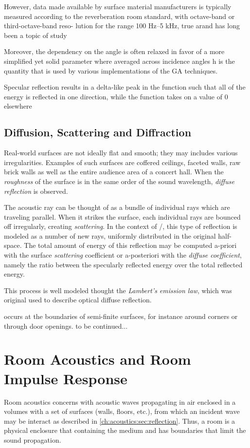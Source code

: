 However, data made available by surface material manufacturers is typically measured according to the reverberation room standard, with octave-band or third-octave-band reso- lution for the range 100 Hz–5 kHz,
true arand has long been a topic of study

Moreover, the dependency on the angle is often relaxed in favor of a more simplified yet solid parameter where
averaged across incidence angles h is the quantity that is used by various implementations of the GA techniques.

Specular reflection results in a delta-like peak in the function such that all of the energy is reflected in one direction, while the function takes on a value of 0 elsewhere

\subsection{Diffusion, Scattering and Diffraction}
Real-world surfaces are not ideally flat and smooth; they may includes various irregularities.
Examples of such surfaces are coffered ceilings, faceted walls, raw brick walls as well as the entire audience area of a concert hall.
When the \textit{roughness} of the surface is in the same order of the sound wavelength, \textit{diffuse reflection} is observed.

The acoustic ray can be thought of as a bundle of individual rays which are traveling parallel.
When it strikes the surface, each individual rays are bounced off irregularly, creating \textit{scattering}.
In the context of \GA/, this type of reflection is modeled as a number of new rays, uniformly distributed in the original half-space.
The total amount of energy of this reflection may be computed a-priori with the surface \textit{scattering} coefficient
or a-posteriori with the \textit{diffuse coefficient}, namely the ratio between
the specularly reflected energy over the total reflected energy.

This process is well modeled thought the \textit{Lambert's emission law}, which was original used to describe optical diffuse reflection.

 occurs at the boundaries of semi-finite surfaces, for instance around corners or through door openings.
to be continued...



\section{Room Acoustics and Room Impulse Response}
Room acoustics concerns with acoustic waves propagating in air enclosed in a volumes with a set of surfaces
(walls, floors, etc.), from which an incident wave may be interact as described in \cref{ch:acoustics:sec:reflection}.
Thus, a room is a physical enclosure that containing the medium and has boundaries that limit the sound propagation.

